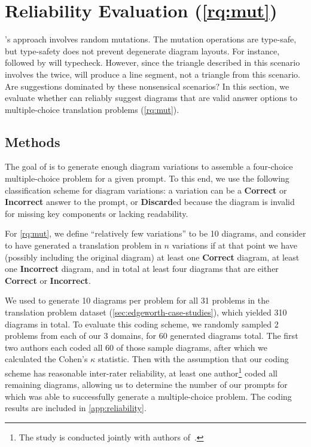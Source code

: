 \section{Reliability Evaluation (\ref{rq:mut})}
\label{sec:reliability-eval}

\Edgeworth's approach involves random mutations. The mutation operations are type-safe, but type-safety does not prevent degenerate diagram layouts. For instance,  followed by  will typecheck. However, since the triangle described in this scenario involves the  twice, \Edgeworth will produce a line segment, not a triangle from this scenario. Are \Edgeworth suggestions dominated by these nonsensical scenarios? In this section, we evaluate whether \Edgeworth can reliably suggest diagrams that are valid answer options to multiple-choice translation problems (\ref{rq:mut}). 

\subsection{Methods}
\label{sec:reliability-method}

The goal of \Edgeworth is to generate enough diagram variations to assemble a four-choice multiple-choice problem for a given prompt. To this end, we use the following classification scheme for diagram variations: a variation can be a \textbf{Correct} or \textbf{Incorrect} answer to the prompt, or \textbf{Discard}ed because the diagram is invalid for missing key components or lacking readability.

For \ref{rq:mut}, we define ``relatively few variations'' to be 10 diagrams, and consider \Edgeworth to have generated a translation problem in $n$ variations if at that point we have (possibly including the original diagram) at least one \textbf{Correct} diagram, at least one \textbf{Incorrect} diagram, and in total at least four diagrams that are either \textbf{Correct} or \textbf{Incorrect}.

We used \Edgeworth to generate 10 diagrams per problem for all 31 problems in the translation problem dataset (\cref{sec:edgeworth-case-studies}), which yielded 310 diagrams in total. To evaluate this coding scheme, we randomly sampled 2 problems from each of our 3 domains, for 60 generated diagrams total. The first two authors each coded all 60 of those sample diagrams, after which we calculated the Cohen's $\kappa$ \cite{cohen1960coefficient} statistic. Then with the assumption that our coding scheme has reasonable inter-rater reliability, at least one author\footnote{The study is conducted jointly with authors of~\citet{ni_edgeworth_2024}.} coded all remaining diagrams, allowing us to determine the number of our prompts for which \Edgeworth was able to successfully generate a multiple-choice problem. The coding results are included in \cref{app:reliability}.

